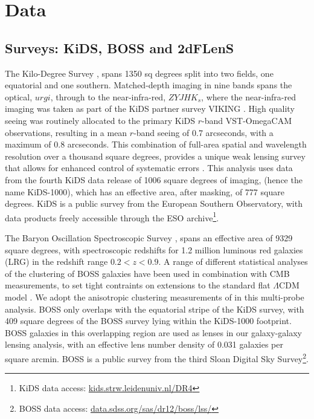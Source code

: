 \section{Data}
\label{sec:data}

\subsection{Surveys:  KiDS, BOSS and 2dFLenS}
\label{sec:surveys}

The Kilo-Degree Survey \citep[KiDS,][]{dejong/etal:2013}, spans 1350 sq degrees split into two fields, one
equatorial and one southern.    Matched-depth imaging in nine bands spans the optical,
$urgi$, through to the near-infra-red, $ZYJHK_s$, where the
near-infra-red imaging was taken as part of the KiDS partner survey
VIKING \citep[the VISTA Kilo-degree INfrared Galaxy
survey,][]{edge/etal:2013}.  High quality seeing was
routinely allocated to the primary KiDS $r$-band VST-OmegaCAM observations, resulting in a
mean $r$-band seeing of 0.7 arcseconds, with a maximum of 0.8
arcseconds.  This combination of full-area spatial and wavelength
resolution over a thousand square degrees,
provides a unique weak lensing survey that allows for enhanced
control of systematic errors \citep{giblin/etal:inprep, hildebrandt/etal:inprep}.
This analysis uses data from the fourth KiDS
data release of 1006 square degrees of imaging, (hence the name KiDS-1000), which has an effective
area, after masking, of 777 square degrees.  KiDS is a public survey from the European Southern
Observatory, with data products freely accessible through the ESO
archive\footnote{KiDS data access: \href{http://kids.strw.leidenuniv.nl/DR4}{kids.strw.leidenuniv.nl/DR4}}.   

The Baryon Oscillation Spectroscopic Survey
\citep[BOSS,][]{alam/etal:2015}, spans an effective area of 9329 square
degrees, with spectroscopic redshifts for 1.2 million luminous red
galaxies (LRG) in the redshift range $0.2<z<0.9$.   A range of
different statistical analyses of the clustering of BOSS galaxies have been used in combination with CMB
measurements, to set tight contraints on extensions to the standard
flat $\Lambda$CDM model \citep[see][and references
therein]{alam/etal:2017}.   We adopt the anisotropic clustering
measurements of \citet{sanchez/etal:2017} in this multi-probe analysis.
BOSS only overlaps with the equatorial stripe
of the KiDS survey, with 409 square degrees of the BOSS survey lying within
the KiDS-1000 footprint.  BOSS galaxies in this overlapping region are used as lenses in
our galaxy-galaxy lensing analysis, with an effective lens number density of 0.031
galaxies per square arcmin.  BOSS is a public survey from the third Sloan
Digital Sky Survey\footnote{BOSS data access: \href{https://data.sdss.org/sas/dr12/boss/lss/}{data.sdss.org/sas/dr12/boss/lss/}}.   

